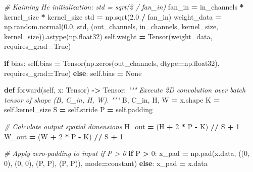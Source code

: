 \documentclass[
  letterpaper,
]{scrbook}
\newenvironment{Shaded}{\begin{snugshade}}{\end{snugshade}}
\newcommand{\CommentTok}[1]{\textcolor[rgb]{0.56,0.35,0.01}{\textit{#1}}}
\newcommand{\ControlFlowTok}[1]{\textcolor[rgb]{0.13,0.29,0.53}{\textbf{#1}}}
\newcommand{\DecValTok}[1]{\textcolor[rgb]{0.00,0.00,0.81}{#1}}
\newcommand{\FloatTok}[1]{\textcolor[rgb]{0.00,0.00,0.81}{#1}}
\newcommand{\KeywordTok}[1]{\textcolor[rgb]{0.13,0.29,0.53}{\textbf{#1}}}
\newcommand{\NormalTok}[1]{#1}
\newcommand{\OperatorTok}[1]{\textcolor[rgb]{0.81,0.36,0.00}{\textbf{#1}}}
\newcommand{\StringTok}[1]{\textcolor[rgb]{0.31,0.60,0.02}{#1}}
\newcommand{\VariableTok}[1]{\textcolor[rgb]{0.00,0.00,0.00}{#1}}
\begin{document}
\begin{Shaded}
\begin{Highlighting}[]
        \CommentTok{\# Kaiming He initialization: std = sqrt(2 / fan\_in)}
\NormalTok{        fan\_in }\OperatorTok{=}\NormalTok{ in\_channels }\OperatorTok{*}\NormalTok{ kernel\_size }\OperatorTok{*}\NormalTok{ kernel\_size}
\NormalTok{        std }\OperatorTok{=}\NormalTok{ np.sqrt(}\FloatTok{2.0} \OperatorTok{/}\NormalTok{ fan\_in)}
\NormalTok{        weight\_data }\OperatorTok{=}\NormalTok{ np.random.normal(}\FloatTok{0.0}\NormalTok{, std, (out\_channels, in\_channels, kernel\_size, kernel\_size)).astype(np.float32)}
        \VariableTok{self}\NormalTok{.weight }\OperatorTok{=}\NormalTok{ Tensor(weight\_data, requires\_grad}\OperatorTok{=}\VariableTok{True}\NormalTok{)}

        \ControlFlowTok{if}\NormalTok{ bias:}
            \VariableTok{self}\NormalTok{.bias }\OperatorTok{=}\NormalTok{ Tensor(np.zeros(out\_channels, dtype}\OperatorTok{=}\NormalTok{np.float32), requires\_grad}\OperatorTok{=}\VariableTok{True}\NormalTok{)}
        \ControlFlowTok{else}\NormalTok{:}
            \VariableTok{self}\NormalTok{.bias }\OperatorTok{=} \VariableTok{None}

    \KeywordTok{def}\NormalTok{ forward(}\VariableTok{self}\NormalTok{, x: Tensor) }\OperatorTok{{-}\textgreater{}}\NormalTok{ Tensor:}
        \CommentTok{"""}
\CommentTok{        Execute 2D convolution over batch tensor of shape (B, C\_in, H, W).}
\CommentTok{        """}
\NormalTok{        B, C\_in, H, W }\OperatorTok{=}\NormalTok{ x.shape}
\NormalTok{        K }\OperatorTok{=} \VariableTok{self}\NormalTok{.kernel\_size}
\NormalTok{        S }\OperatorTok{=} \VariableTok{self}\NormalTok{.stride}
\NormalTok{        P }\OperatorTok{=} \VariableTok{self}\NormalTok{.padding}

        \CommentTok{\# Calculate output spatial dimensions}
\NormalTok{        H\_out }\OperatorTok{=}\NormalTok{ (H }\OperatorTok{+} \DecValTok{2} \OperatorTok{*}\NormalTok{ P }\OperatorTok{{-}}\NormalTok{ K) }\OperatorTok{//}\NormalTok{ S }\OperatorTok{+} \DecValTok{1}
\NormalTok{        W\_out }\OperatorTok{=}\NormalTok{ (W }\OperatorTok{+} \DecValTok{2} \OperatorTok{*}\NormalTok{ P }\OperatorTok{{-}}\NormalTok{ K) }\OperatorTok{//}\NormalTok{ S }\OperatorTok{+} \DecValTok{1}

        \CommentTok{\# Apply zero{-}padding to input if P \textgreater{} 0}
        \ControlFlowTok{if}\NormalTok{ P }\OperatorTok{\textgreater{}} \DecValTok{0}\NormalTok{:}
\NormalTok{            x\_pad }\OperatorTok{=}\NormalTok{ np.pad(x.data, ((}\DecValTok{0}\NormalTok{, }\DecValTok{0}\NormalTok{), (}\DecValTok{0}\NormalTok{, }\DecValTok{0}\NormalTok{), (P, P), (P, P)), mode}\OperatorTok{=}\StringTok{\textquotesingle{}constant\textquotesingle{}}\NormalTok{)}
        \ControlFlowTok{else}\NormalTok{:}
\NormalTok{            x\_pad }\OperatorTok{=}\NormalTok{ x.data}


\end{Highlighting}
\end{Shaded}
\end{document}
